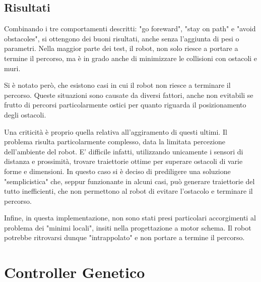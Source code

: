 \documentclass[UTF8]{article}
\begin{document}
\subsection{Risultati}

Combinando i tre comportamenti descritti: "go foreward", "stay on path" e  "avoid obstacoles", si ottengono dei buoni risultati, anche senza l'aggiunta di pesi o parametri. Nella maggior parte dei test, il robot, non solo riesce a portare a termine il percorso, ma è in grado anche di minimizzare le collisioni con ostacoli e muri.

Si è notato però, che esistono  casi in cui il robot non riesce a terminare il percorso. Queste situazioni sono causate da diversi fattori, anche non evitabili se frutto di percorsi particolarmente ostici per quanto riguarda il posizionamento degli ostacoli. 

Una criticità è proprio quella relativa all'aggiramento di questi ultimi. Il problema risulta particolarmente complesso, data la limitata percezione dell'ambiente del robot. E' difficile infatti, utilizzando unicamente i sensori di distanza e prossimità, trovare traiettorie ottime per superare ostacoli di varie forme e dimensioni. In questo caso si è deciso di prediligere una soluzione "semplicistica" che, seppur funzionante in alcuni casi, può generare traiettorie del tutto inefficienti, che non permettono al robot di evitare l'ostacolo e terminare il percorso.

Infine, in questa implementazione, non sono stati presi particolari accorgimenti al problema dei "minimi locali", insiti nella progettazione a motor schema.  Il robot potrebbe ritrovarsi dunque "intrappolato" e non portare a termine il percorso.



\section{Controller Genetico}
\end{document}
